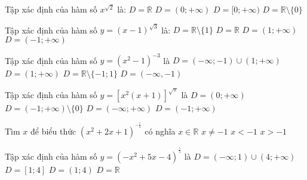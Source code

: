 \begin{ex}%
	Tập xác định của hàm số $x^{\sqrt{2}}$ là:
	\choice
	{$D=\mathbb{R}$}
	{\True $D=(0; +\infty)$}
	{$D=[0; +\infty)$}
	{$D=\mathbb{R} \setminus\{0\}$}
\end{ex}
\begin{ex}%
	Tập xác định của hàm số $y=(x-1)^{\sqrt{3}}$ là:
	\choice
	{$D=\mathbb{R} \setminus \{1\}$}
	{$D=\mathbb{R}$}
	{\True $D=(1; +\infty)$}
	{$D=(-1; +\infty)$}
\end{ex}
\begin{ex}%
	Tập xác định của hàm số $y=\left(x^2-1\right)^{-3}$ là
	\choice
	{$D=(-\infty; -1) \cup(1; +\infty)$}
	{$D=(1; +\infty)$}
	{\True $D=\mathbb{R} \setminus \{-1; 1\}$}
	{$D=(-\infty,-1)$}
\end{ex}
\begin{ex}%
	Tập xác định của hàm số $y=\left[x^2(x+1)\right]^{\sqrt{\pi}}$ là
	\choice
	{$D=(0; +\infty)$}
	{\True $D=(-1; +\infty) \setminus\{0\}$}
	{$D=(-\infty; +\infty)$}
	{$D=(-1; +\infty)$}
\end{ex}
\begin{ex}%
	Tìm $x$ để biểu thức $\left(x^2+2 x+1\right)^{^{-\tfrac{1}{3}}}$ có nghĩa
	\choice
	{$x \in \mathbb{R}$}
	{\True $x \neq -1$}
	{$x<-1$}
	{$x>-1$}
\end{ex}
\begin{ex}%
	Tập xác định của hàm số $y=\left(-x^2+5 x-4\right)^{^{\tfrac{5}{3}}}$ là
	\choice
	{$D=(-\infty; 1) \cup(4; +\infty)$}
	{$D=[1; 4]$}
	{\True $D=(1; 4)$}
	{$D=\mathbb{R}$}
\end{ex}
